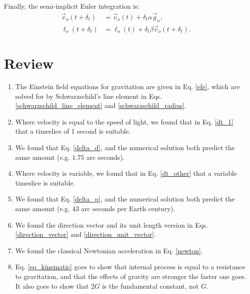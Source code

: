 \documentclass[12pt]{article}
\begin{document}
Finally, the semi-implicit Euler integration is:
\begin{align}
\label{eq_velocity}
\vec{v}_{o}(t + \delta_t) &= \vec{v}_{o}(t) + \delta_{t} \alpha \vec{g}_n, \\
\label{eq_position}
\ell_{o}(t + \delta_t) &= \ell_{o}(t) + \delta_{t} \beta \vec{v}_{o}(t + \delta_t).
\end{align}






\section {Review}

\begin{enumerate}

\item
The Einstein field equations for gravitation are given in Eq. \ref{efe}, which are solved for by Schwarzschild's line element in Eqs. \ref{schwarzschild_line_element} and \ref{schwarzschild_radius}.

\item
Where velocity is equal to the speed of light, we found that in Eq. \ref{dt_1} that a timeslice of 1 second is suitable.

\item
We found that Eq. \ref{delta_d}, and the numerical solution both predict the same amount (e.g. $1.75$ arc seconds).

\item
Where velocity is variable, we found that in Eq. \ref{dt_other} that a variable timeslice is suitable.

\item
We found that Eq. \ref{delta_p}, and the numerical solution both predict the same amount (e.g. $43$ arc seconds per Earth century).

\item
We found the direction vector and its unit length version in Eqs. \ref{direction_vector} and \ref{direction_unit_vector}.

\item
We found the classical Newtonian acceleration in Eq. \ref{newton}.

\item
Eq. \ref{eq_kinematic} goes to show that internal process is equal to a resistance to gravitation, and that the effects of gravity are stronger the faster one goes.
It also goes to show that $2G$ is the fundamental constant, not $G$.


\end{enumerate}
\end{document}
